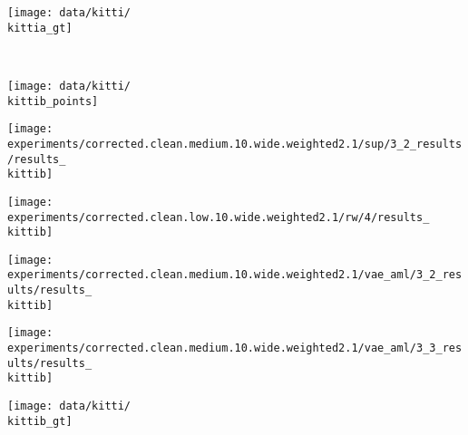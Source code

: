 {\begin{minipage}[t]{0.15\textwidth}
	\texttt{[image: data/kitti/\\kittia\_gt]}
\end{minipage}
\\[-4px]
\begin{minipage}[t]{0.15\textwidth}
	\vspace{0px}\centering
	\texttt{[image: data/kitti/\\kittib\_points]}
\end{minipage}
\begin{minipage}[t]{0.15\textwidth}
	\vspace{0px}\centering
	\texttt{[image: experiments/corrected.clean.medium.10.wide.weighted2.1/sup/3\_2\_results/results\_\\kittib]}
\end{minipage}
\begin{minipage}[t]{0.15\textwidth}
	\vspace{0px}\centering
	\texttt{[image: experiments/corrected.clean.low.10.wide.weighted2.1/rw/4/results\_\\kittib]}
\end{minipage}
\begin{minipage}[t]{0.15\textwidth}
	\vspace{0px}\centering
	\texttt{[image: experiments/corrected.clean.medium.10.wide.weighted2.1/vae\_aml/3\_2\_results/results\_\\kittib]}
\end{minipage}
\begin{minipage}[t]{0.15\textwidth}
	\vspace{0px}\centering
	\texttt{[image: experiments/corrected.clean.medium.10.wide.weighted2.1/vae\_aml/3\_3\_results/results\_\\kittib]}
\end{minipage}
\begin{minipage}[t]{0.15\textwidth}
	\vspace{0px}\centering
	\texttt{[image: data/kitti/\\kittib\_gt]}

\end{minipage}}
